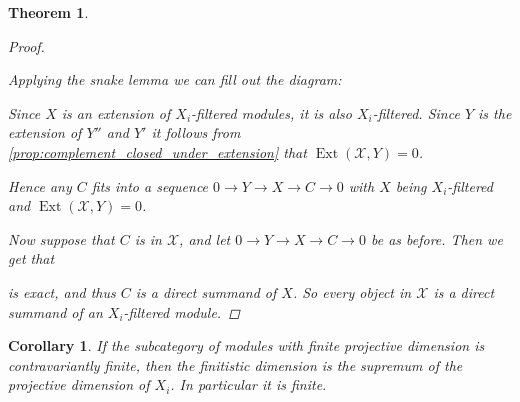 \documentclass[11pt, a4paper, english]{article}
\newtheorem{theorem}{Theorem}[section]
\newtheorem{cor}{Corollary}[theorem]
\theoremstyle{definition}
\DeclareMathOperator{\Hom}{Hom}
\DeclareMathOperator{\Ext}{Ext}
\begin{document}
\begin{theorem}
\begin{proof}
		\begin{center}
		\end{center}
		Applying the snake lemma we can fill out the diagram:
		\begin{center}
		\end{center}
		Since $X$ is an extension of $X_i$-filtered modules, it is also $X_i$-filtered. Since $Y$ is the extension of $Y''$ and $Y'$ it follows from \cref{prop:complement_closed_under_extension} that $\Ext(\mathcal X, Y)=0$.
		
		Hence any $C$ fits into a sequence $0 \to Y \to X \to C \to 0$ with $X$ being $X_i$-filtered and $\Ext(\mathcal X, Y)=0$.
		
		Now suppose that $C$ is in $\mathcal X$, and let $0 \to Y \to X \to C \to 0$ be as before. Then we get that
		\begin{center}
		\end{center}
		is exact, and thus $C$ is a direct summand of $X$. So every object in $\mathcal X$ is a direct summand of an $X_i$-filtered module.
	\end{proof}
\end{theorem}

\begin{cor}
	If the subcategory of modules with finite projective dimension is contravariantly finite, then the finitistic dimension is the supremum of the projective dimension of $X_i$. In particular it is finite.
\end{cor}
\end{document}
